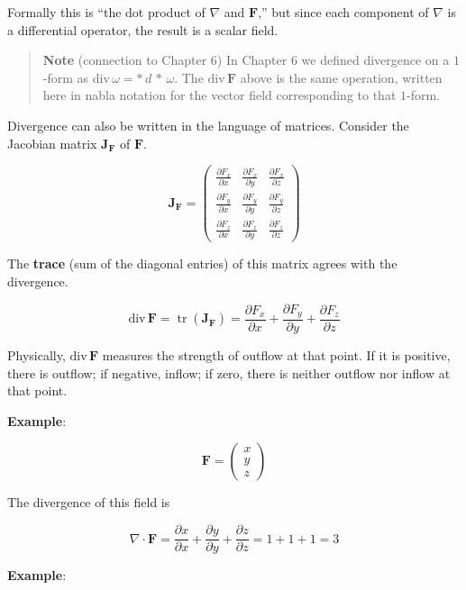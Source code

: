 Formally this is ``the dot product of \(\nabla\) and \(\mathbf{F}\),''
but since each component of \(\nabla\) is a differential operator, the
result is a scalar field.

\begin{quote}
\textbf{Note} (connection to Chapter 6) In Chapter 6 we defined
divergence on a \(1\)-form as
\(\mathrm{div}\,\omega = \ast\,d\,\ast\,\omega\). The
\(\mathrm{div}\,\mathbf{F}\) above is the same operation, written here
in nabla notation for the vector field corresponding to that \(1\)-form.
\end{quote}

Divergence can also be written in the language of matrices. Consider the
Jacobian matrix \(\mathbf{J}_\mathbf{F}\) of \(\mathbf{F}\).

\[\mathbf{J}_\mathbf{F} = \begin{pmatrix}
\frac{\partial F_x}{\partial x} & \frac{\partial F_x}{\partial y} & \frac{\partial F_x}{\partial z} \\[0.3em]
\frac{\partial F_y}{\partial x} & \frac{\partial F_y}{\partial y} & \frac{\partial F_y}{\partial z} \\[0.3em]
\frac{\partial F_z}{\partial x} & \frac{\partial F_z}{\partial y} & \frac{\partial F_z}{\partial z}
\end{pmatrix}\]

The \textbf{trace} (sum of the diagonal entries) of this matrix agrees
with the divergence.

\[\mathrm{div}\,\mathbf{F} = \operatorname{tr}(\mathbf{J}_\mathbf{F}) = \frac{\partial F_x}{\partial x} + \frac{\partial F_y}{\partial y} + \frac{\partial F_z}{\partial z}\]

Physically, \(\mathrm{div}\,\mathbf{F}\) measures the strength of
outflow at that point. If it is positive, there is outflow; if negative,
inflow; if zero, there is neither outflow nor inflow at that point.

\textbf{Example}:

\[
\mathbf{F}
=
\begin{pmatrix}
x\\
y\\
z
\end{pmatrix}
\]

The divergence of this field is

\[\nabla \cdot \mathbf{F} = \frac{\partial x}{\partial x} + \frac{\partial y}{\partial y} + \frac{\partial z}{\partial z} = 1 + 1 + 1 = 3\]

\textbf{Example}:

